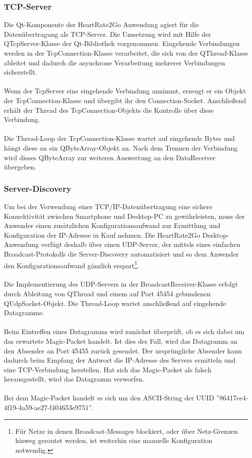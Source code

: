 \subsubsection{TCP-Server}
Die Qt-Komponente der HeartRate2Go Anwendung agiert für die Datenübertragung als TCP-Server. Die Umsetzung wird mit Hilfe der QTcpServer-Klasse der Qt-Bibliothek vorgenommen\cite{qtcpserver}. Eingehende Verbindungen werden in der TcpConnection-Klasse verarbeitet, die sich von der QThread-Klasse ableitet und dadurch die asynchrone Verarbeitung mehrerer Verbindungen sicherstellt.\\
\\
Wenn der TcpServer eine eingehende Verbindung annimmt, erzeugt er ein Objekt der TcpConnection-Klasse und übergibt ihr den Connection-Socket. Anschließend erhält der Thread des TcpConnection-Objekts die Kontrolle über diese Verbindung.\\
\\
Die Thread-Loop der TcpConnection-Klasse wartet auf eingehende Bytes und hängt diese an ein QByteArray-Objekt an. Nach dem Trennen der Verbindung wird dieses QByteArray zur weiteren Auswertung an den DataReceiver übergeben.

\subsubsection{Server-Discovery}
Um bei der Verwendung einer TCP/IP-Datenübertragung eine sichere Konnektivität zwischen Smartphone und Desktop-PC zu gewährleisten, muss der Anwender einen zusätzlichen Konfigurationsaufwand zur Ermittlung und Konfiguration der IP-Adresse in Kauf nehmen. Die HeartRate2Go Desktop-Anwendung verfügt deshalb über einen UDP-Server, der mittels eines einfachen Broadcast-Protokolls die Server-Discovery automatisiert und so dem Anwender den Konfigurationsaufwand gänzlich erspart\footnote{Für Netze in denen Broadcast-Messages blockiert, oder über Netz-Grenzen hinweg geroutet werden, ist weiterhin eine manuelle Konfiguration notwendig.}.\\
\\
Die Implementierung des UDP-Servers in der BroadcastReceiver-Klasse erfolgt durch Ableitung von QThread und einem auf Port 45454 gebundenen QUdpSocket-Objekt\cite{qudpsocket}. Die Thread-Loop wartet anschließend auf eingehende Datagramme.\\
\\
Beim Eintreffen eines Datagramms wird zunächst überprüft, ob es sich dabei um das erwartete Magic-Packet handelt. Ist dies der Fall, wird das Datagramm an den Absender an Port 45455 zurück gesendet. Der ursprüngliche Absender kann dadurch beim Empfang der Antwort die IP-Adresse des Servers ermitteln und eine TCP-Verbindung herstellen. Hat sich das Magic-Packet als falsch herausgestellt, wird das Datagramm verworfen.\\
\\
Bei dem Magic-Packet handelt es sich um den ASCII-String der UUID ''86417ce4-4f19-4a59-ae27-f404653e9751''.

